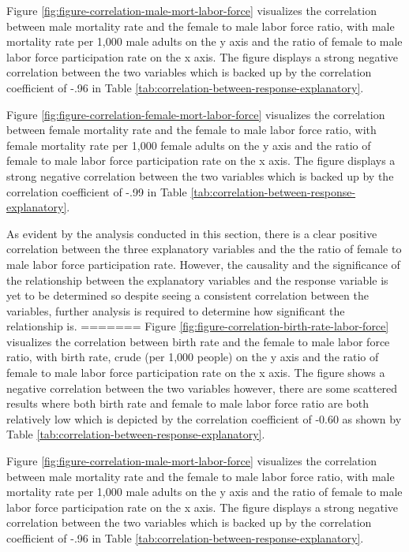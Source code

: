 \documentclass[11pt,a4paper,]{article}
\begin{document}
Figure \ref{fig:figure-correlation-male-mort-labor-force} visualizes the
correlation between male mortality rate and the female to male labor
force ratio, with male mortality rate per 1,000 male adults on the y
axis and the ratio of female to male labor force participation rate on
the x axis. The figure displays a strong negative correlation between
the two variables which is backed up by the correlation coefficient of
-.96 in Table \ref{tab:correlation-between-response-explanatory}.

Figure \ref{fig:figure-correlation-female-mort-labor-force} visualizes
the correlation between female mortality rate and the female to male
labor force ratio, with female mortality rate per 1,000 female adults on
the y axis and the ratio of female to male labor force participation
rate on the x axis. The figure displays a strong negative correlation
between the two variables which is backed up by the correlation
coefficient of -.99 in Table
\ref{tab:correlation-between-response-explanatory}.

As evident by the analysis conducted in this section, there is a clear
positive correlation between the three explanatory variables and the the
ratio of female to male labor force participation rate. However, the
causality and the significance of the relationship between the
explanatory variables and the response variable is yet to be determined
so despite seeing a consistent correlation between the variables,
further analysis is required to determine how significant the
relationship is.
=======
Figure \ref{fig:figure-correlation-birth-rate-labor-force} visualizes the correlation between birth rate and the female to male labor force ratio, with birth rate, crude (per 1,000 people) on the y axis and the ratio of female to male labor force participation rate on the x axis. The figure shows a negative correlation between the two variables however, there are some scattered results where both birth rate and female to male labor force ratio are both relatively low which is depicted by the correlation coefficient of -0.60 as shown by Table \ref{tab:correlation-between-response-explanatory}.

Figure \ref{fig:figure-correlation-male-mort-labor-force} visualizes the correlation between male mortality rate and the female to male labor force ratio, with male mortality rate per 1,000 male adults on the y axis and the ratio of female to male labor force participation rate on the x axis. The figure displays a strong negative correlation between the two variables which is backed up by the correlation coefficient of -.96 in Table \ref{tab:correlation-between-response-explanatory}.
\end{document}
